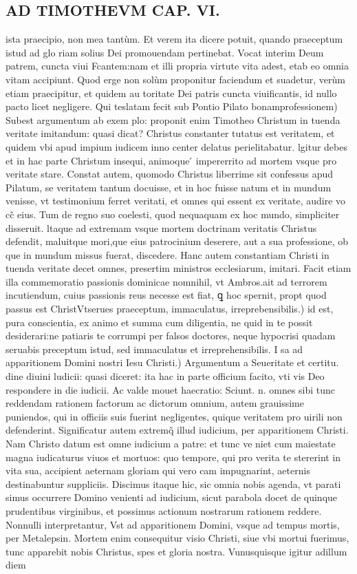 \documentclass{article}
\begin{document}
\begin{pages}
\section*{AD TIMOTHEVM CAP. VI. }
\marginpar{[ p.130 ]}\pstart ista praecipio, non mea tantùm. Et verem ita dicere potuit, quando praeceptum istud ad glo riam solius Dei promouendam pertinebat. Vocat interim Deum patrem, cuncta viui Fcantem:nam et illi propria virtute vita adest, etab eo omnia vitam accipiunt. Quod erge non solùm proponitur faciendum et suadetur, verùm etiam praecipitur, et quidem au toritate Dei patris cuncta viuificantis, id nullo pacto licet negligere.  \pend\pstart Qui teslatam fecit sub Pontio Pilato bonamprofessionem) Subest argumentum ab exem plo: proponit enim Timotheo Christum in tuenda veritate imitandum: quasi dicat? Christus constanter tutatus est veritatem, et quidem vbi apud impium iudicem inno center delatus perielitabatur. lgitur debes et in hac parte Christum insequi, animoque ́ impererrito ad mortem vsque pro veritate stare. Constat autem, quomodo Christus liberrime sit confessus apud Pilatum, se veritatem tantum docuisse, et in hoc fuisse natum et in mundum venisse, vt testimonium ferret veritati, et omnes qui essent ex veritate, audire vo cc̃ eius. Tum de regno suo coelesti, quod nequaquam ex hoc mundo, simpliciter disseruit. ltaque ad extremam vsque mortem doctrinam veritatis Christus defendit, maluitque mori,que eius patrocinium deserere, aut a sua professione, ob que in mundum missus fuerat, discedere. Hanc autem constantiam Christi in tuenda veritate decet omnes, presertim ministros ecclesiarum, imitari. Facit etiam illa commemoratio passionis dominicae nomnihil, vt Ambros.ait ad terrorem incutiendum, cuius passionis reus necesse est fiat, ꝗ hoc spernit, propt quod passus est ChristVtserues praeceptum, immaculatus, irreprebensibilis.) id est, pura conscientia, ex animo et summa cum diligentia, ne quid in te possit desiderari:ne patiaris te corrumpi per falsos doctores, neque hypocrisi quadam seruabis preceptum istud, sed immaculatus et irreprehensibilis. I sa ad apparitionem Domini nostri Iesu Christi.) Argumentum a Seueritate et certitu. dine diuini ludicii: quasi diceret: ita hac in parte officium facito, vti vis Deo respondere in die iudicii. Ac valde mouet haecratio: Sciunt. n. omnes sibi tunc reddendam rationem factorum ac dictorum omnium, autem grauissime puniendos, qui in officiis suis fuerint negligentes, quique veritatem pro uirili non defenderint. Significatur autem extremq̃ illud iudicium, per apparitionem Christi. Nam Christo datum est omne iudicium a patre: et tunc ve niet cum maiestate magna iudicaturus viuos et mortuos: quo tempore, qui pro verita te stererint in vita sua, accipient aeternam gloriam qui vero cam impugnarint, aeternis destinabuntur suppliciis. Discimus itaque hic, sic omnia nobis agenda, vt parati simus occurrere Domino venienti ad iudicium, sicut parabola docet de quinque prudentibus virginibus, et possimus actionum nostrarum rationem reddere. Nonnulli interpretantur, Vst ad apparitionem Domini, vsque ad tempus mortis, per Metalepsin. Mortem enim consequitur visio Christi, siue vbi mortui fuerimus, tunc apparebit nobis Christus, spes et gloria nostra. Vunusquisque igitur adillum diem 
\end{pages}
\end{document}

